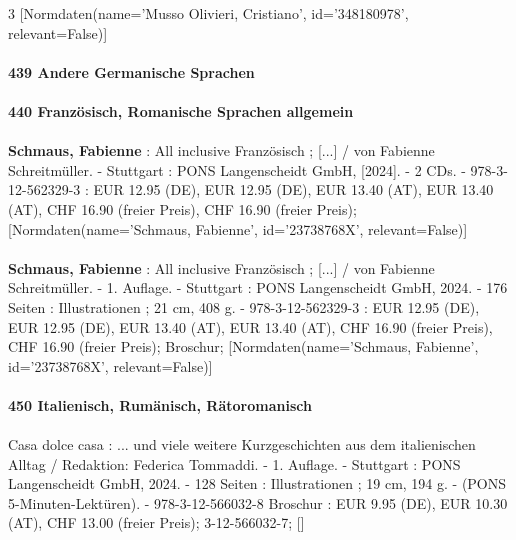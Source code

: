 \documentclass{article}
\begin{document}
\begin{multicols}{3}
[Normdaten(name='Musso Olivieri, Cristiano', id='348180978', relevant=False)]\\\\\textbf{439 Andere Germanische Sprachen}\\\\\textbf{440 Französisch, Romanische Sprachen allgemein}\\\\\textbf{Schmaus, Fabienne} : All inclusive Französisch ; [...] / von Fabienne Schreitmüller. - Stuttgart : PONS Langenscheidt GmbH, [2024]. - 2 CDs. - 978-3-12-562329-3 : EUR 12.95 (DE), EUR 12.95 (DE), EUR 13.40 (AT), EUR 13.40 (AT), CHF 16.90 (freier Preis), CHF 16.90 (freier Preis); [Normdaten(name='Schmaus, Fabienne', id='23738768X', relevant=False)]\\\\\textbf{Schmaus, Fabienne} : All inclusive Französisch ; [...] / von Fabienne Schreitmüller. - 1. Auflage. - Stuttgart : PONS Langenscheidt GmbH, 2024. - 176 Seiten : Illustrationen ; 21 cm, 408 g. - 978-3-12-562329-3 : EUR 12.95 (DE), EUR 12.95 (DE), EUR 13.40 (AT), EUR 13.40 (AT), CHF 16.90 (freier Preis), CHF 16.90 (freier Preis); Broschur; [Normdaten(name='Schmaus, Fabienne', id='23738768X', relevant=False)]\\\\\textbf{450 Italienisch, Rumänisch, Rätoromanisch}\\\\Casa dolce casa : ... und viele weitere Kurzgeschichten aus dem italienischen Alltag / Redaktion: Federica Tommaddi. - 1. Auflage. - Stuttgart : PONS Langenscheidt GmbH, 2024. - 128 Seiten : Illustrationen ; 19 cm, 194 g. - (PONS 5-Minuten-Lektüren). - 978-3-12-566032-8 Broschur : EUR 9.95 (DE), EUR 10.30 (AT), CHF 13.00 (freier Preis); 3-12-566032-7; []

\end{multicols}
\end{document}
